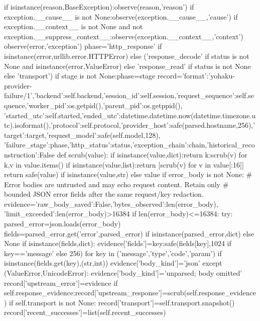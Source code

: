 {            if isinstance(reason,BaseException):observe(reason,'reason')
            if exception.__cause__ is not None:observe(exception.__cause__,'cause')
            if exception.__context__ is not None and not exception.__suppress_context__:observe(exception.__context__,'context')
        observe(error,'exception')
        phase='http_response' if isinstance(error,urllib.error.HTTPError) else ('response_decode' if status is not None and isinstance(error,ValueError) else 'response_read' if status is not None else 'transport')
        if stage is not None:phase=stage
        record={'format':'yohaku-provider-failure/1','backend':self.backend,'session_id':self.session,'request_sequence':self.sequence,'worker_pid':os.getpid(),'parent_pid':os.getppid(),
                'started_utc':self.started,'ended_utc':datetime.datetime.now(datetime.timezone.utc).isoformat(),'protocol':self.protocol,'provider_host':safe(parsed.hostname,256),'target':target,'request_model':safe(self.model,128),
                'failure_stage':phase,'http_status':status,'exception_chain':chain,'historical_reconstruction':False}
        def scrub(value):
            if isinstance(value,dict):return {k:scrub(v) for k,v in value.items()}
            if isinstance(value,list):return [scrub(v) for v in value[:16]]
            return safe(value) if isinstance(value,str) else value
        if error_body is not None:
            # Error bodies are untrusted and may echo request content. Retain only
            # bounded JSON error fields after the same request/key redaction.
            evidence={'raw_body_saved':False,'bytes_observed':len(error_body),
                      'limit_exceeded':len(error_body)>16384}
            if len(error_body)<=16384:
                try:
                    parsed_error=json.loads(error_body)
                    fields=parsed_error.get('error',parsed_error) if isinstance(parsed_error,dict) else None
                    if isinstance(fields,dict):
                        evidence['fields']={key:safe(fields[key],1024 if key=='message' else 256)
                            for key in ('message','type','code','param') if isinstance(fields.get(key),(str,int))}
                    evidence['body_kind']='json'
                except (ValueError,UnicodeError):
                    evidence['body_kind']='unparsed; body omitted'
            record['upstream_error']=evidence
        if self.response_evidence:record['upstream_response']=scrub(self.response_evidence)
        if self.transport is not None:
            record['transport']=self.transport.snapshot()
            record['recent_successes']=list(self.recent_successes)
}
